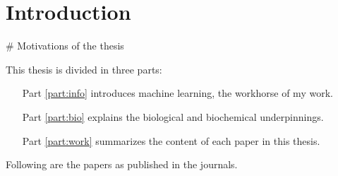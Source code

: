 \chapter{Introduction}
\# Motivations of the thesis

This thesis is divided in three parts:

\begin{itemize}
	\item[Part \ref{part:info}] introduces machine learning, the workhorse of my work.
	\item[Part \ref{part:bio}] explains the biological and biochemical underpinnings.
	\item[Part \ref{part:work}] summarizes the content of each paper in this thesis.
\end{itemize}

Following are the papers as published in the journals.
